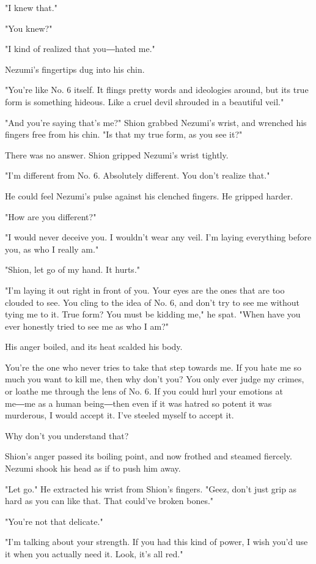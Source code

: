 "I knew that."

"You knew?"

"I kind of realized that you―hated me."

Nezumi's fingertips dug into his chin.

"You're like No. 6 itself. It flings pretty words and ideologies around,
but its true form is something hideous. Like a cruel devil shrouded in a
beautiful veil."

"And you're saying that's me?" Shion grabbed Nezumi's wrist, and
wrenched his fingers free from his chin. "Is that my true form, as you
see it?"

There was no answer. Shion gripped Nezumi's wrist tightly.

"I'm different from No. 6. Absolutely different. You don't realize
that."

He could feel Nezumi's pulse against his clenched fingers. He gripped
harder.

"How are you different?"

"I would never deceive you. I wouldn't wear any veil. I'm laying
everything before you, as who I really am."

"Shion, let go of my hand. It hurts."

"I'm laying it out right in front of you. Your eyes are the ones that
are too clouded to see. You cling to the idea of No. 6, and don't try to
see me without tying me to it. True form? You must be kidding me," he
spat. "When have you ever honestly tried to see me as who I am?"

His anger boiled, and its heat scalded his body.

You're the one who never tries to take that step towards me. If you hate
me so much you want to kill me, then why don't you? You only ever judge
my crimes, or loathe me through the lens of No. 6. If you could hurl
your emotions at me―me as a human being―then even if it was hatred so
potent it was murderous, I would accept it. I've steeled myself to
accept it.

Why don't you understand that?

Shion's anger passed its boiling point, and now frothed and steamed
fiercely. Nezumi shook his head as if to push him away.

"Let go." He extracted his wrist from Shion's fingers. "Geez, don't just
grip as hard as you can like that. That could've broken bones."

"You're not that delicate."

"I'm talking about your strength. If you had this kind of power, I wish
you'd use it when you actually need it. Look, it's all red."

